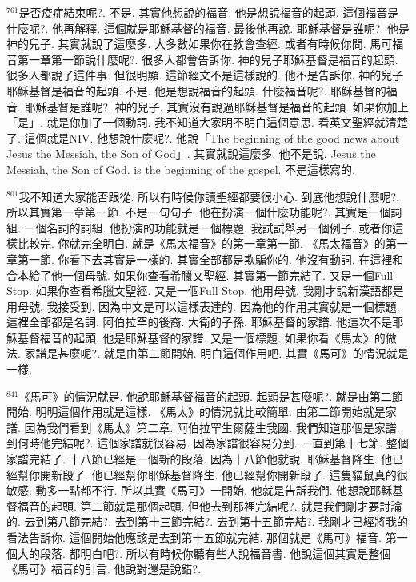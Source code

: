 \documentclass{book}
\begin{document}
$^{761}$是否疫症結束呢?.
不是.
其實他想說的福音.
他是想說福音的起頭.
這個福音是什麼呢?.
他再解釋.
這個就是耶穌基督的福音.
最後他再說.
耶穌基督是誰呢?.
他是神的兒子.
其實就說了這麼多.
大多數如果你在教會查經.
或者有時候你問.
馬可福音第一章第一節說什麼呢?.
很多人都會告訴你.
神的兒子耶穌基督是福音的起頭.
很多人都說了這件事.
但很明顯.
這節經文不是這樣說的.
他不是告訴你.
神的兒子耶穌基督是福音的起頭.
不是.
他是想說福音的起頭.
什麼福音呢?.
耶穌基督的福音.
耶穌基督是誰呢?.
神的兒子.
其實沒有說過耶穌基督是福音的起頭.
如果你加上「是」.
就是你加了一個動詞.
我不知道大家明不明白這個意思.
看英文聖經就清楚了.
這個就是NIV.
他想說什麼呢?.
他說「The beginning of the good news about Jesus the Messiah, the Son of God」.
其實就說這麼多.
他不是說.
Jesus the Messiah, the Son of God.
is the beginning of the gospel.
不是這樣寫的.

$^{801}$我不知道大家能否跟從.
所以有時候你讀聖經都要很小心.
到底他想說什麼呢?.
所以其實第一章第一節.
不是一句句子.
他在扮演一個什麼功能呢?.
其實是一個詞組.
一個名詞的詞組.
他扮演的功能就是一個標題.
我試試舉另一個例子.
或者你這樣比較完.
你就完全明白.
就是《馬太福音》的第一章第一節.
《馬太福音》的第一章第一節.
你看下去其實是一樣的.
其實全部都是欺騙你的.
他沒有動詞.
在這裡和合本給了他一個母號.
如果你查看希臘文聖經.
其實第一節完結了.
又是一個Full Stop.
如果你查看希臘文聖經.
又是一個Full Stop.
他用母號.
我剛才說新漢語都是用母號.
我接受到.
因為中文是可以這樣表達的.
因為他的作用其實就是一個標題.
這裡全部都是名詞.
阿伯拉罕的後裔.
大衛的子孫.
耶穌基督的家譜.
他這次不是耶穌基督福音的起頭.
他是耶穌基督的家譜.
又是一個標題.
如果你看《馬太》的做法.
家譜是甚麼呢?.
就是由第二節開始.
明白這個作用吧.
其實《馬可》的情況就是一樣.

$^{841}$《馬可》的情況就是.
他說耶穌基督福音的起頭.
起頭是甚麼呢?.
就是由第二節開始.
明明這個作用就是這樣.
《馬太》的情況就比較簡單.
由第二節開始就是家譜.
因為我們看到《馬太》第二章.
阿伯拉罕生爾薩生我國.
我們知道那個是家譜.
到何時他完結呢?.
這個家譜就很容易.
因為家譜很容易分到.
一直到第十七節.
整個家譜完結了.
十八節已經是一個新的段落.
因為十八節他就說.
耶穌基督降生.
他已經幫你開新段了.
他已經幫你耶穌基督降生.
他已經幫你開新段了.
這隻貓鼠真的很敏感.
動多一點都不行.
所以其實《馬可》一開始.
他就是告訴我們.
他想說耶穌基督福音的起頭.
第二節就是那個起頭.
但他去到那裡完結呢?.
就是我們剛才要討論的.
去到第八節完結?.
去到第十三節完結?.
去到第十五節完結?.
我剛才已經將我的看法告訴你.
這個開始他應該是去到第十五節就完結.
那個就是《馬可》福音.
第一個大的段落.
都明白吧?.
所以有時候你聽有些人說福音書.
他說這個其實是整個《馬可》福音的引言.
他說對還是說錯?.
\end{document}
